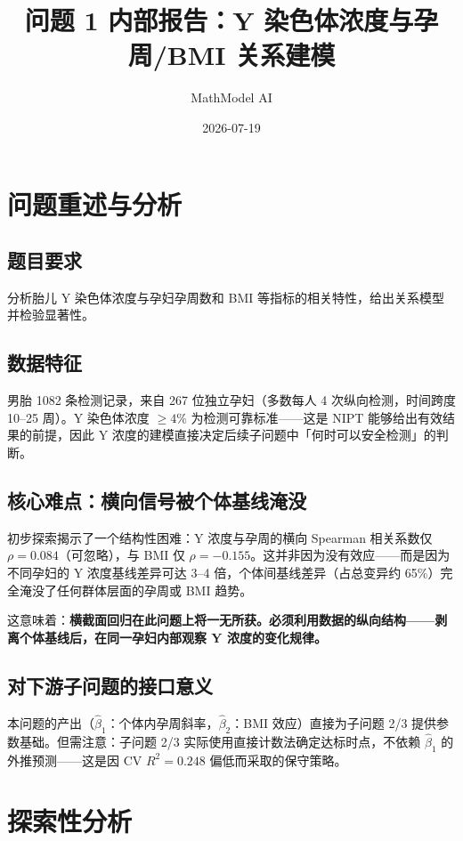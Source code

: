 \documentclass{internal-report}
\title{问题 1 内部报告：Y 染色体浓度与孕周/BMI 关系建模}
\author{MathModel AI}
\date{2026-07-19}
\begin{document}
\maketitle

\section{问题重述与分析}

\subsection{题目要求}

分析胎儿 Y 染色体浓度与孕妇孕周数和 BMI 等指标的相关特性，给出关系模型并检验显著性。

\subsection{数据特征}

男胎 1082 条检测记录，来自 267 位独立孕妇（多数每人 4 次纵向检测，时间跨度 10--25 周）。Y 染色体浓度 $\geq 4\%$ 为检测可靠标准——这是 NIPT 能够给出有效结果的前提，因此 Y 浓度的建模直接决定后续子问题中「何时可以安全检测」的判断。

\subsection{核心难点：横向信号被个体基线淹没}

初步探索揭示了一个结构性困难：Y 浓度与孕周的横向 Spearman 相关系数仅 $\rho=0.084$（可忽略），与 BMI 仅 $\rho=-0.155$。这并非因为没有效应——而是因为不同孕妇的 Y 浓度基线差异可达 3--4 倍，个体间基线差异（占总变异约 65\%）完全淹没了任何群体层面的孕周或 BMI 趋势。

这意味着：\textbf{横截面回归在此问题上将一无所获。必须利用数据的纵向结构——剥离个体基线后，在同一孕妇内部观察 Y 浓度的变化规律。}

\subsection{对下游子问题的接口意义}

本问题的产出（$\hat{\beta}_1$：个体内孕周斜率，$\hat{\beta}_2$：BMI 效应）直接为子问题 2/3 提供参数基础。但需注意：子问题 2/3 实际使用直接计数法确定达标时点，不依赖 $\hat{\beta}_1$ 的外推预测——这是因 CV $R^2=0.248$ 偏低而采取的保守策略。

\section{探索性分析}
\end{document}
